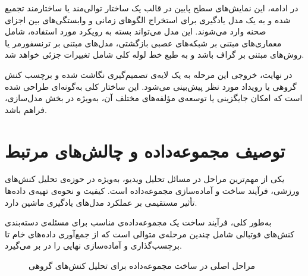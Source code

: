 \documentclass[12pt]{report}
\begin{document}
در ادامه، این نمایش‌های سطح پایین در قالب یک ساختار توالی‌مند یا ساختارمند تجمیع شده و به یک مدل یادگیری برای استخراج الگوهای زمانی و وابستگی‌های بین اجزای صحنه وارد می‌شوند. این مدل می‌تواند بسته به رویکرد مورد استفاده، شامل معماری‌های مبتنی بر شبکه‌های عصبی بازگشتی، مدل‌های مبتنی بر ترنسفورمر یا روش‌های مبتنی بر گراف باشد و به طبع خط لوله کلی شامل تغییرات جزئی خواهد شد.

در نهایت، خروجی این مرحله به یک لایه‌ی تصمیم‌گیری نگاشت شده و برچسب کنش گروهی یا رویداد مورد نظر پیش‌بینی می‌شود. این ساختار کلی به‌گونه‌ای طراحی شده است که امکان جایگزینی یا توسعه‌ی مؤلفه‌های مختلف آن، به‌ویژه در بخش مدل‌سازی، فراهم باشد.

\section{توصیف مجموعه‌داده و چالش‌های مرتبط}
\label{sec:dataset_construction}

یکی از مهم‌ترین مراحل در مسائل تحلیل ویدیو، به‌ویژه در حوزه‌ی تحلیل کنش‌های ورزشی، فرآیند ساخت و آماده‌سازی مجموعه‌داده است. کیفیت و نحوه‌ی تهیه‌ی داده‌ها تأثیر مستقیمی بر عملکرد مدل‌های یادگیری ماشین دارد.

به‌طور کلی، فرآیند ساخت یک مجموعه‌داده‌ی مناسب برای مسئله‌ی دسته‌بندی کنش‌های فوتبالی شامل چندین مرحله‌ی متوالی است که از جمع‌آوری داده‌های خام تا برچسب‌گذاری و آماده‌سازی نهایی را در بر می‌گیرد.

\begin{figure}[H]
\centering
{}
\caption{مراحل اصلی در ساخت مجموعه‌داده برای تحلیل کنش‌های گروهی}
\label{fig:dataset_pipeline}
\end{figure}
\end{document}
